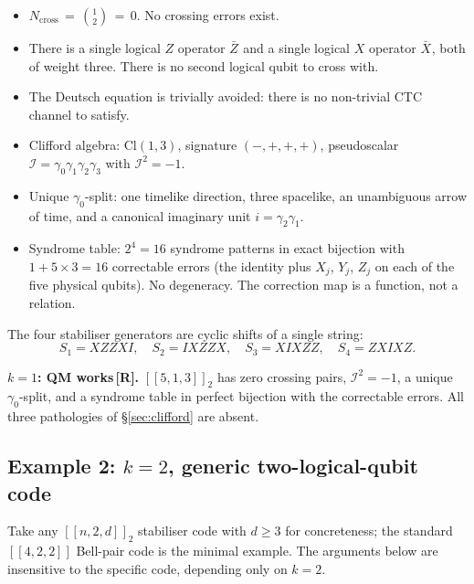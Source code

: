 \documentclass[11pt,a4paper]{article}
\newcommand{\Rmark}{\textcolor{green!50!black}{\textbf{[R]}}}
\newcommand{\Cq}[4]{[\![#1,#2,#3]\!]_{#4}}
\providecommand{\Cl}[1]{\mathrm{Cl}(#1)}
\newcommand{\Lx}[1]{\bar{X}_{#1}}
\newcommand{\Lz}[1]{\bar{Z}_{#1}}
\begin{document}
\begin{itemize}\setlength\itemsep{2pt}
  \item $N_{\mathrm{cross}} \,=\, \binom{1}{2} \,=\, 0$. No crossing errors exist.
  \item There is a single logical $Z$ operator $\Lz{}$ and a single logical $X$ operator $\Lx{}$, both of weight three. There is no second logical qubit to cross with.
  \item The Deutsch equation is trivially avoided: there is no non-trivial CTC channel to satisfy.
  \item Clifford algebra: $\Cl{1,3}$, signature $(-,+,+,+)$, pseudoscalar $\mathcal{I}=\gamma_0\gamma_1\gamma_2\gamma_3$ with $\mathcal{I}^2=-1$.
  \item Unique $\gamma_0$-split: one timelike direction, three spacelike, an unambiguous arrow of time, and a canonical imaginary unit $i=\gamma_2\gamma_1$.
  \item Syndrome table: $2^4=16$ syndrome patterns in exact bijection with $1+5\times 3=16$ correctable errors (the identity plus $X_j$, $Y_j$, $Z_j$ on each of the five physical qubits). No degeneracy. The correction map is a function, not a relation.
\end{itemize}

The four stabiliser generators are cyclic shifts of a single string:
\begin{equation}
  S_1 = XZZXI,\quad S_2 = IXZZX,\quad S_3 = XIXZZ,\quad S_4 = ZXIXZ.
  \label{eq:stabilisers}
\end{equation}

\begin{mdframed}[backgroundcolor=Rbg,linecolor=Rcolor,linewidth=1.5pt]
\textbf{$k=1$: QM works\,\Rmark.}\quad
$\Cq{5}{1}{3}{2}$ has zero crossing pairs, $\mathcal{I}^2=-1$, a unique $\gamma_0$-split, and a syndrome table in perfect bijection with the correctable errors. All three pathologies of \S\ref{sec:clifford} are absent.
\end{mdframed}

\subsection{Example 2: $k=2$, generic two-logical-qubit code}
\label{sec:ex_k2}

Take any $[\![n,2,d]\!]_2$ stabiliser code with $d\geq3$ for concreteness; the standard $[\![4,2,2]\!]$ Bell-pair code is the minimal example. The arguments below are insensitive to the specific code, depending only on $k=2$.
\end{document}
